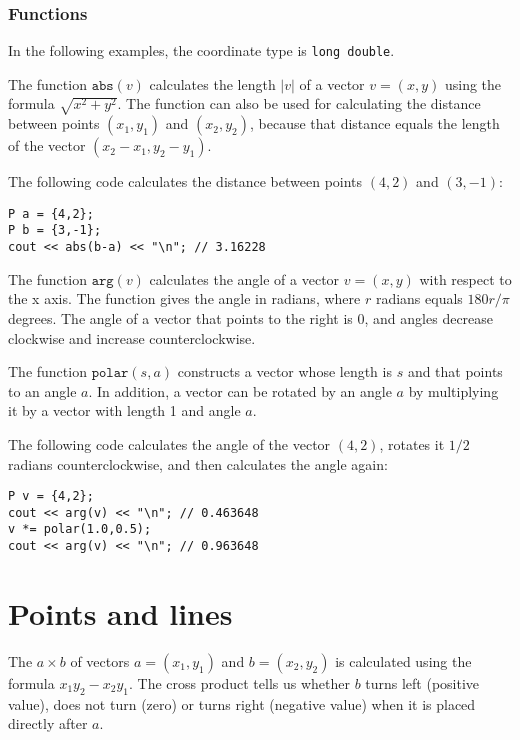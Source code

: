 \subsubsection*{Functions}

In the following examples, the coordinate type is
\texttt{long double}.

The function $\texttt{abs}(v)$ calculates the length
$|v|$ of a vector $v=(x,y)$
using the formula $\sqrt{x^2+y^2}$.
The function can also be used for
calculating the distance between points
$(x_1,y_1)$ and $(x_2,y_2)$,
because that distance equals the length
of the vector $(x_2-x_1,y_2-y_1)$.

The following code calculates the distance
between points $(4,2)$ and $(3,-1)$:
\begin{lstlisting}
P a = {4,2};
P b = {3,-1};
cout << abs(b-a) << "\n"; // 3.16228
\end{lstlisting}

The function $\texttt{arg}(v)$ calculates the
angle of a vector $v=(x,y)$ with respect to the x axis.
The function gives the angle in radians,
where $r$ radians equals $180 r/\pi$ degrees.
The angle of a vector that points to the right is 0,
and angles decrease clockwise and increase
counterclockwise.

The function $\texttt{polar}(s,a)$ constructs a vector
whose length is $s$ and that points to an angle $a$.
In addition, a vector can be rotated by an angle $a$
by multiplying it by a vector with length 1 and angle $a$.

The following code calculates the angle of
the vector $(4,2)$, rotates it $1/2$ radians
counterclockwise, and then calculates the angle again:

\begin{lstlisting}
P v = {4,2};
cout << arg(v) << "\n"; // 0.463648
v *= polar(1.0,0.5);
cout << arg(v) << "\n"; // 0.963648
\end{lstlisting}

\section{Points and lines}


The  $a \times b$ of vectors
$a=(x_1,y_1)$ and $b=(x_2,y_2)$ is calculated
using the formula $x_1 y_2 - x_2 y_1$.
The cross product tells us whether $b$
turns left (positive value), does not turn (zero)
or turns right (negative value)
when it is placed directly after $a$.

